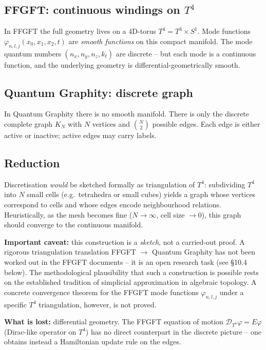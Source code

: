 \subsection{\texorpdfstring{FFGFT: continuous windings on $T^4$}{FFGFT: continuous windings on T4}}

In FFGFT the full geometry lives on a 4D-torus $T^4 = T^3 \times S^1$.
Mode functions $\varphi_{n,l,j}(x_0, x_1, x_2, t)$ are \emph{smooth
functions} on this compact manifold. The mode quantum numbers
$(n_x, n_y, n_z, k_t)$ are discrete -- but each mode is a continuous
function, and the underlying geometry is differential-geometrically
smooth.

\subsection{Quantum Graphity: discrete graph}

In Quantum Graphity there is no smooth manifold. There is only the
discrete complete graph $K_N$ with $N$ vertices and $\binom{N}{2}$
possible edges. Each edge is either active or inactive; active
edges may carry labels.

\subsection{Reduction}

Discretisation \emph{would} be sketched formally as triangulation of
$T^4$: subdividing $T^4$ into $N$ small cells (e.g.\ tetrahedra or
small cubes) yields a graph whose vertices correspond to cells and
whose edges encode neighbourhood relations. Heuristically, as the
mesh becomes fine ($N \to \infty$, cell size $\to 0$), this graph
should converge to the continuous manifold.

\textbf{Important caveat:} this construction is a \emph{sketch}, not
a carried-out proof. A rigorous triangulation translation FFGFT
$\to$ Quantum Graphity has not been worked out in the FFGFT
documents -- it is an open research task (see §10.4 below). The
methodological plausibility that such a construction is possible
rests on the established tradition of simplicial approximation in
algebraic topology. A concrete convergence theorem for the FFGFT
mode functions $\varphi_{n,l,j}$ under a specific $T^4$ triangulation,
however, is not proved.

\textbf{What is lost:} differential geometry. The FFGFT equation of
motion $\mathcal{D}_{T^4}\varphi = E\varphi$ (Dirac-like operator on
$T^4$) has no direct counterpart in the discrete picture -- one
obtains instead a Hamiltonian update rule on the edges.

